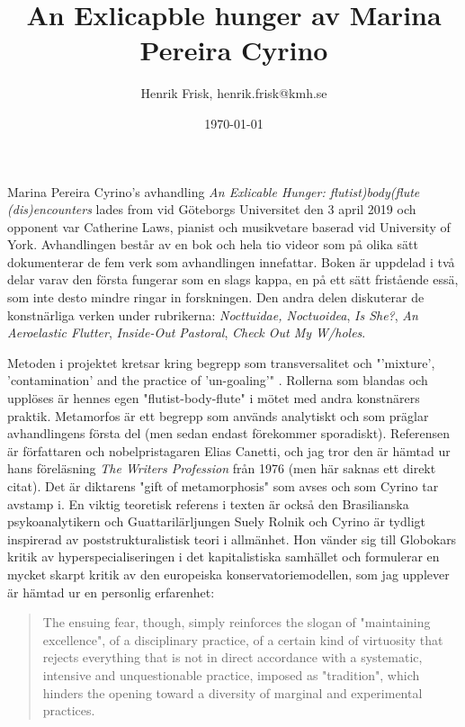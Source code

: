 \documentclass[11pt]{article}
\author{Henrik Frisk, henrik.frisk@kmh.se}
\date{\today}
\title{An Exlicapble hunger av Marina Pereira Cyrino}
\begin{document}
\maketitle
Marina Pereira Cyrino's avhandling \emph{An Exlicable Hunger: flutist)body(flute (dis)encounters} lades from vid Göteborgs Universitet den 3 april 2019 och opponent var Catherine Laws, pianist och musikvetare baserad vid University of York. Avhandlingen består av en bok och hela tio videor som på olika sätt dokumenterar de fem verk som avhandlingen innefattar. Boken är uppdelad i två delar varav den första fungerar som en slags kappa, en på ett sätt fristående essä, som inte desto mindre ringar in forskningen. Den andra delen diskuterar de konstnärliga verken under rubrikerna: \emph{Nocttuidae, Noctuoidea}, \emph{Is She?}, \emph{An Aeroelastic Flutter}, \emph{Inside-Out Pastoral}, \emph{Check Out My W/holes}.

Metoden i projektet kretsar kring begrepp som transversalitet och "'mixture', 'contamination' and the practice
of 'un-goaling'" \citep[s. 7 (abstract)]{Cyrino2019}. Rollerna som blandas och upplöses är hennes egen "flutist-body-flute" i mötet med andra konstnärers praktik. Metamorfos är ett begrepp som används analytiskt och som präglar avhandlingens första del (men sedan endast förekommer sporadiskt). Referensen är författaren och nobelpristagaren Elias Canetti, och jag tror den är hämtad ur hans föreläsning \emph{The Writers Profession} från 1976 (men här saknas ett direkt citat). Det är diktarens "gift of metamorphosis" som avses och som Cyrino tar avstamp i. En viktig teoretisk referens i texten är också den Brasilianska psykoanalytikern och Guattarilärljungen Suely Rolnik och Cyrino är tydligt inspirerad av poststrukturalistisk teori i allmänhet. Hon vänder sig till Globokars kritik av hyperspecialiseringen i det kapitalistiska samhället och formulerar en mycket skarpt kritik av den europeiska konservatoriemodellen, som jag upplever är hämtad ur en personlig erfarenhet:

\begin{quote}
The ensuing fear, though, simply reinforces the slogan of
"maintaining excellence", of a disciplinary practice, of a certain
kind of virtuosity that rejects everything that is not in direct
accordance with a systematic, intensive and unquestionable
practice, imposed as "tradition", which hinders the opening
toward a diversity of marginal and experimental practices. \citep[s. 23]{Cyrino2019}
\end{quote}
\end{document}
